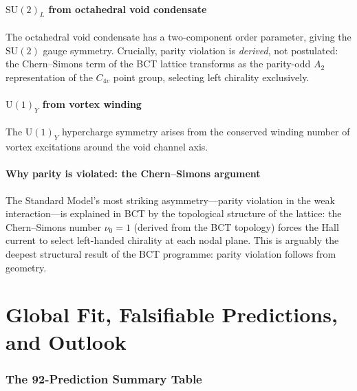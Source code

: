 \documentclass[review,number,sort&compress]{elsarticle}
\begin{document}
\subsection{$\mathrm{SU}(2)_L$ from octahedral void condensate}

The octahedral void condensate has a two-component order parameter,
giving the $\mathrm{SU}(2)$ gauge symmetry. Crucially, parity violation
is \textit{derived}, not postulated: the Chern--Simons term of the BCT
lattice transforms as the parity-odd $A_2$ representation of the
$C_{4v}$ point group, selecting left chirality exclusively.

\subsection{$\mathrm{U}(1)_Y$ from vortex winding}

The $\mathrm{U}(1)_Y$ hypercharge symmetry arises from the conserved
winding number of vortex excitations around the void channel axis.

\subsection{Why parity is violated: the Chern--Simons argument}

The Standard Model's most striking asymmetry---parity violation in the
weak interaction---is explained in BCT by the topological structure of
the lattice: the Chern--Simons number $\nu_0 = 1$ (derived from the
BCT topology) forces the Hall current to select left-handed chirality
at each nodal plane. This is arguably the deepest structural result of
the BCT programme: parity violation follows from geometry.



\part{Global Fit, Falsifiable Predictions, and Outlook}
\label{part:global}

\section{The 92-Prediction Summary Table}
\label{sec:summary_table}
\end{document}
